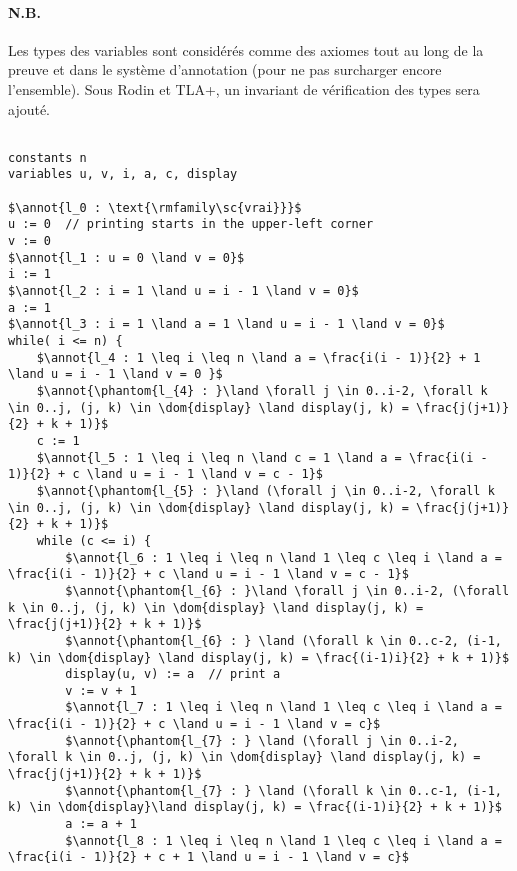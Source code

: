\documentclass[a4paper, 11pt]{article}
\DeclareMathOperator{\ddom}{Dom}
\newcommand{\dom}[1]{\ddom\left(#1\right)}
\theoremstyle{mystyle}
\newcommand{\annot}[1]{{\color{black} #1}}
\begin{document}
\paragraph{N.B.} Les types des variables sont considérés comme des axiomes tout au long de la preuve et dans le système d'annotation (pour ne pas surcharger encore l'ensemble). Sous Rodin et TLA+, un invariant de vérification des types sera ajouté.

\clearpage\begin{lstlisting}[language=prooflang, mathescape,
    basicstyle=\ttfamily\large\color{blue!90!black},
    keywordstyle=\bfseries,
    tabsize=4]

constants n
variables u, v, i, a, c, display

$\annot{l_0 : \text{\rmfamily\sc{vrai}}}$
u := 0  // printing starts in the upper-left corner
v := 0
$\annot{l_1 : u = 0 \land v = 0}$
i := 1
$\annot{l_2 : i = 1 \land u = i - 1 \land v = 0}$
a := 1
$\annot{l_3 : i = 1 \land a = 1 \land u = i - 1 \land v = 0}$
while( i <= n) {
    $\annot{l_4 : 1 \leq i \leq n \land a = \frac{i(i - 1)}{2} + 1 \land u = i - 1 \land v = 0 }$
    $\annot{\phantom{l_{4} : }\land \forall j \in 0..i-2, \forall k \in 0..j, (j, k) \in \dom{display} \land display(j, k) = \frac{j(j+1)}{2} + k + 1)}$
    c := 1
    $\annot{l_5 : 1 \leq i \leq n \land c = 1 \land a = \frac{i(i - 1)}{2} + c \land u = i - 1 \land v = c - 1}$
    $\annot{\phantom{l_{5} : }\land (\forall j \in 0..i-2, \forall k \in 0..j, (j, k) \in \dom{display} \land display(j, k) = \frac{j(j+1)}{2} + k + 1)}$
    while (c <= i) {
        $\annot{l_6 : 1 \leq i \leq n \land 1 \leq c \leq i \land a = \frac{i(i - 1)}{2} + c \land u = i - 1 \land v = c - 1}$
        $\annot{\phantom{l_{6} : }\land \forall j \in 0..i-2, (\forall k \in 0..j, (j, k) \in \dom{display} \land display(j, k) = \frac{j(j+1)}{2} + k + 1)}$
        $\annot{\phantom{l_{6} : } \land (\forall k \in 0..c-2, (i-1, k) \in \dom{display} \land display(j, k) = \frac{(i-1)i}{2} + k + 1)}$
        display(u, v) := a  // print a
        v := v + 1
        $\annot{l_7 : 1 \leq i \leq n \land 1 \leq c \leq i \land a = \frac{i(i - 1)}{2} + c \land u = i - 1 \land v = c}$
        $\annot{\phantom{l_{7} : } \land (\forall j \in 0..i-2, \forall k \in 0..j, (j, k) \in \dom{display} \land display(j, k) = \frac{j(j+1)}{2} + k + 1)}$
        $\annot{\phantom{l_{7} : } \land (\forall k \in 0..c-1, (i-1, k) \in \dom{display}\land display(j, k) = \frac{(i-1)i}{2} + k + 1)}$
        a := a + 1
        $\annot{l_8 : 1 \leq i \leq n \land 1 \leq c \leq i \land a = \frac{i(i - 1)}{2} + c + 1 \land u = i - 1 \land v = c}$

\end{lstlisting}
\end{document}
